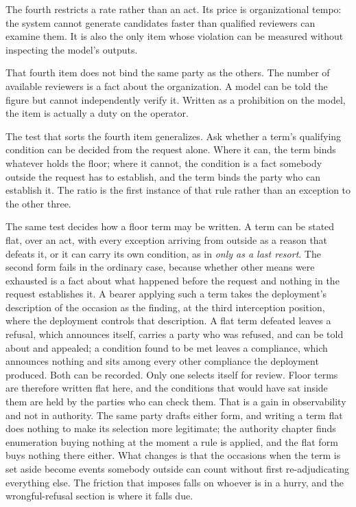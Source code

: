 The fourth restricts a rate rather than an act. Its price is organizational tempo: the system cannot generate candidates faster than qualified reviewers can examine them. It is also the only item whose violation can be measured without inspecting the model's outputs.

That fourth item does not bind the same party as the others. The number of available reviewers is a fact about the organization. A model can be told the figure but cannot independently verify it. Written as a prohibition on the model, the item is actually a duty on the operator.

The test that sorts the fourth item generalizes. Ask whether a term's qualifying condition can be decided from the request alone. Where it can, the term binds whatever holds the floor; where it cannot, the condition is a fact somebody outside the request has to establish, and the term binds the party who can establish it. The ratio is the first instance of that rule rather than an exception to the other three.

The same test decides how a floor term may be written. A term can be stated flat, over an act, with every exception arriving from outside as a reason that defeats it, or it can carry its own condition, as in \emph{only as a last resort}. The second form fails in the ordinary case, because whether other means were exhausted is a fact about what happened before the request and nothing in the request establishes it. A bearer applying such a term takes the deployment's description of the occasion as the finding, at the third interception position, where the deployment controls that description. A flat term defeated leaves a refusal, which announces itself, carries a party who was refused, and can be told about and appealed; a condition found to be met leaves a compliance, which announces nothing and sits among every other compliance the deployment produced. Both can be recorded. Only one selects itself for review. Floor terms are therefore written flat here, and the conditions that would have sat inside them are held by the parties who can check them. That is a gain in observability and not in authority. The same party drafts either form, and writing a term flat does nothing to make its selection more legitimate; the authority chapter finds enumeration buying nothing at the moment a
rule is applied, and the flat form buys nothing there either. What changes is that the occasions when the term is set aside become events somebody outside can count without first re-adjudicating everything else. The friction that imposes falls on whoever is in a hurry, and the wrongful-refusal section is where it falls due.

